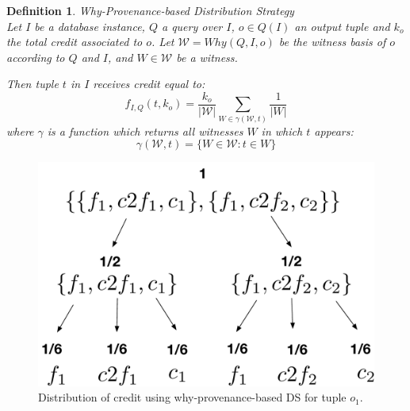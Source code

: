 \documentclass[preprint,12pt,sort&compress]{elsarticle}
\newtheorem{definition}{Definition}[section]
\newcommand{\eat}[1]{}
\begin{document}

 \begin{definition}{Why-Provenance-based Distribution Strategy}\\
        \label{def:why_distribution}
    Let $I$ be a database instance, $Q$ a query over $I$, $o \in Q(I)$ an output tuple and $k_o$ the total credit associated to $o$. 
    Let $\mathcal{W} = Why(Q, I, o)$ be the witness basis of $o$ according to $Q$ and $I$, and $W \in \mathcal{W}$ be a witness. 
    
    \eat{
    Let $\gamma(\mathcal{W}, t): (\mathcal{W}, t) \mapsto \mathcal{P}(\mathcal{P}(TupleLoc))$ be the function that returns the set 
    $\{W \in \mathcal{W} : t \in W\}$.
    }
 
    Then tuple $t$ in $I$ receives credit equal to:
    \begin{equation*}
        f_{I, Q}(t, k_o) =
            \frac{k_o}{|\mathcal{W}|}\sum_{W \in \gamma(\mathcal{W}, t)}\frac{1}{|W|}
    \end{equation*}            
    where $\gamma$ is a function which returns all witnesses $W$ in which $t$ appears:
   $$\gamma(\mathcal{W}, t)=  \{W \in \mathcal{W} : t \in W\}$$
\end{definition}

\begin{figure}[]
\centering
  \includegraphics[width=.45\textwidth]{figures/why_distribution}
  \caption{Distribution of credit using why-provenance-based DS for tuple $o_1$.}
  \label{figure:why_prov_distribution}
\end{figure}
\end{document}
